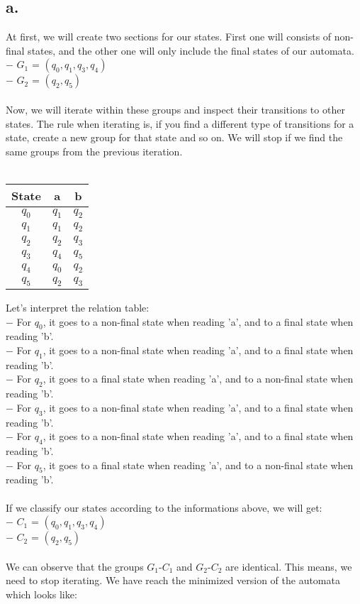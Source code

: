 \documentclass[12pt]{article}
\begin{document}
\subsection*{a.} 
At first, we will create two sections for our states. First one will consists of non-final states, and the other one will only include the final states of our automata.\\
$-$ $G_1$ = $(q_0, q_1, q_3, q_4)$\\
$-$ $G_2$ = $(q_2, q_5)$\\
\\
Now, we will iterate within these groups and inspect their transitions to other states. The rule when iterating is, if you find a different type of transitions  for a state, create a new group for that state and so on. We will stop if we find the same groups from the previous iteration.\\
\\
\begin{table}[H]
        \centering
        \begin{tabular}{|c|c|c|}
		\hline
		State & a & b\\
		\hline
		$q_0$ & $q_1$ & $q_2$\\
		$q_1$ & $q_1$ & $q_2$\\
		$q_2$ & $q_2$ & $q_3$\\
		$q_3$ & $q_4$ & $q_5$\\
		$q_4$ & $q_0$ & $q_2$\\
		$q_5$ & $q_2$ & $q_3$\\
		\hline
               
        \end{tabular}
        

    \end{table}{}

Let's interpret the relation table:\\
$-$ For $q_0$, it goes to a non-final state when reading 'a', and to a final state when reading 'b'.\\ 
$-$ For $q_1$, it goes to a non-final state when reading 'a', and to a final state when reading 'b'.\\
$-$ For $q_2$, it goes to a final state when reading 'a', and to a non-final state when reading 'b'.\\
$-$ For $q_3$, it goes to a non-final state when reading 'a', and to a final state when reading 'b'.\\
$-$ For $q_4$, it goes to a non-final state when reading 'a', and to a final state when reading 'b'.\\
$-$ For $q_5$, it goes to a final state when reading 'a', and to a non-final state when reading 'b'.\\
\\
If we classify our states according to the informations above, we will get:\\
$-$ $C_1$ = $(q_0, q_1, q_3, q_4)$\\
$-$ $C_2$ = $(q_2, q_5)$\\
\\
We can observe that the groups $G_1$-$C_1$ and $G_2$-$C_2$ are identical. This means, we need to stop iterating. We have reach the minimized version of the automata which looks like:\\
\end{document}
